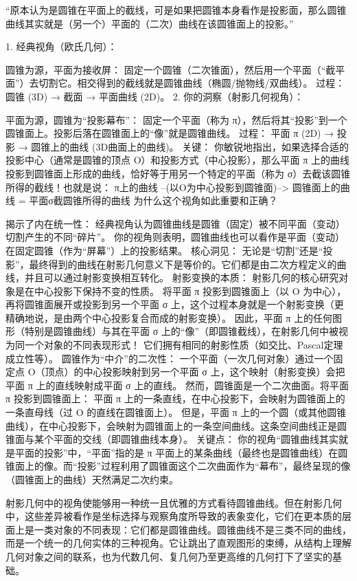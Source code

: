 “原本认为是圆锥在平面上的截线，可是如果把圆锥本身看作是投影面，那么圆锥曲线其实就是（另一个）平面的（二次）曲线在该圆锥面上的投影。”

1. 经典视角（欧氏几何）：

圆锥为源，平面为接收屏： 固定一个圆锥（二次锥面），然后用一个平面（“截平面”）去切割它。相交得到的截线就是圆锥曲线（椭圆/抛物线/双曲线）。
过程： 圆锥 (3D) → 截面 → 平面曲线 (2D)。
2. 你的洞察（射影几何视角）：

平面为源，圆锥为“投影幕布”： 固定一个平面（称为 π），然后将其“投影”到一个圆锥面上。投影后落在圆锥面上的“像”就是圆锥曲线。
过程： 平面 π (2D) → 投影 → 圆锥上的曲线 (3D曲面上的曲线)。
关键： 你敏锐地指出，如果选择合适的投影中心（通常是圆锥的顶点 O）和投影方式（中心投影），那么平面 π 上的曲线投影到圆锥面上形成的曲线，恰好等于用另一个特定的平面（称为 σ）去截该圆锥所得的截线！也就是说：
π上的曲线 --(以O为中心投影到圆锥面)--> 圆锥面上的曲线 = 平面σ截圆锥所得的曲线
为什么这个视角如此重要和正确？

揭示了内在统一性：
经典视角认为圆锥曲线是圆锥（固定）被不同平面（变动）切割产生的不同“碎片”。
你的视角则表明，圆锥曲线也可以看作是平面（变动）在固定圆锥（作为“屏幕”）上的投影结果。
核心洞见： 无论是“切割”还是“投影”，最终得到的曲线在射影几何意义下是等价的。它们都是由二次方程定义的曲线，并且可以通过射影变换相互转化。
射影变换的本质：
射影几何的核心研究对象是在中心投影下保持不变的性质。
将平面 π 投影到圆锥面上（以 O 为中心），再将圆锥面展开或投影到另一个平面 σ 上，这个过程本身就是一个射影变换（更精确地说，是由两个中心投影复合而成的射影变换）。
因此，平面 π 上的任何图形（特别是圆锥曲线）与其在平面 σ 上的“像”（即圆锥截线），在射影几何中被视为同一个对象的不同表现形式！ 它们拥有相同的射影性质（如交比、Pascal定理成立性等）。
圆锥作为“中介”的二次性：
一个平面（一次几何对象）通过一个固定点 O（顶点）的中心投影映射到另一个平面 σ 上，这个映射（射影变换）会把平面 π 上的直线映射成平面 σ 上的直线。
然而，圆锥面是一个二次曲面。将平面 π 投影到圆锥面上：
平面 π 上的一条直线，在中心投影下，会映射为圆锥面上的一条直母线（过 O 的直线在圆锥面上）。
但是，平面 π 上的一个圆（或其他圆锥曲线），在中心投影下，会映射为圆锥面上的一条空间曲线。这条空间曲线正是圆锥面与某个平面的交线（即圆锥曲线本身）。
关键点： 你的视角“圆锥曲线其实就是平面的投影”中，“平面”指的是 π 平面上的某条曲线（最终也是圆锥曲线）在圆锥面上的像。而“投影”过程利用了圆锥面这个二次曲面作为“幕布”，最终呈现的像（圆锥面上的曲线）天然满足二次约束。


射影几何中的视角使能够用一种统一且优雅的方式看待圆锥曲线。但在射影几何中，这些差异被看作是坐标选择与观察角度所导致的表象变化，它们在更本质的层面上是一类对象的不同表现：它们都是圆锥曲线。圆锥曲线不是三类不同的曲线，而是一个统一的几何实体的三种视角。它让跳出了直观图形的束缚，从结构上理解几何对象之间的联系，也为代数几何、复几何乃至更高维的几何打下了坚实的基础。

